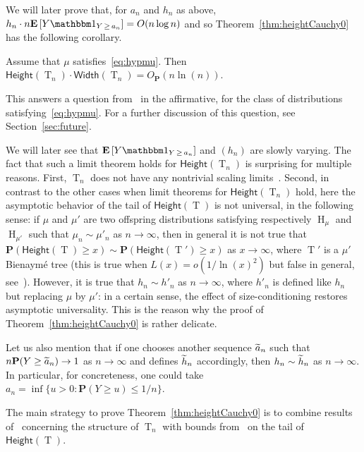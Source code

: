 \documentclass[AHL,Unicode,longabstracts,published]{cedram}
\renewcommand{\H}{\mathsf{Height}}
\newcommand{\p}{\mathbf{P}}
\newcommand{\Width}{\mathsf{Width}}
\newcommand{\E}[1]{{\mathbf E}\left[#1\right]}
\DeclareMathOperator{\rtree}{T}
\DeclareMathOperator{\rmH}{H}
\newcommand{\I}[1]{{\mathbbm 1}_{#1}}
\let\oldtilde\tilde
\renewcommand*{\tilde}[1]{\mathchoice{\widetilde{#1}}{\widetilde{#1}}{\oldtilde{#1}}{\oldtilde{#1}}}
\begin{document}
We will later prove that, for $a_n$ and $h_n$ as above, $h_{n}\cdot n \E{Y\I{Y\,\ge\,a_n}}=O(n \log n)$ and so Theorem~\ref{thm:heightCauchy0} has the following corollary.
\begin{coro}\label{cor:hw}
Assume that $\mu$ satisfies~\eqref{eq:hypmu}. Then $\H(\rtree_{n}) \cdot \Width(\rtree_{n}) = O_{\p}({n \ln(n)})$.
\end{coro}

This answers a question from~\cite{Add19} in the affirmative, for the class of distributions satisfying~\eqref{eq:hypmu}. For a further discussion of this question, see Section~\ref{sec:future}.

We will later see that $\E{Y\I{Y\,\ge\,a_n}}$ and $(h_{n})$ are slowly varying. The fact that such a limit theorem holds for $\H(\rtree_{n})$ is surprising for multiple reasons. First, $\rtree_{n}$ does not have any nontrivial scaling limits~\cite{KR19}. Second, in contrast to the other cases when limit theorems for $\H(\rtree_{n})$ hold, here the asymptotic behavior of the tail of $\H(\rtree)$ is not universal, in the following sense: if $\mu$ and $\mu'$ are two offspring distributions satisfying respectively $\rmH_\mu$ and $\rmH_{\mu'}$ such that $\mu_n \sim \mu'_n$ as $n \rightarrow \infty$, then in general it is not true that $\p(\H(\rtree) \geq x) \sim \p(\H(\rtree') \geq x)$ as $ x \rightarrow \infty$, where $\rtree'$ is a $\mu'$ Bienaymé tree (this is true when $L(x)=o(1/\ln(x)^{2})$ but false in general, see~\cite[Section~3.2]{NW07}). However, it is true that $h_{n} \sim h'_{n}$ as $n \rightarrow \infty$, where $h'_{n}$ is defined like $h_{n}$ but replacing $\mu$ by $\mu'$: in a certain sense, the effect of size-conditioning restores asymptotic universality. This is the reason why the proof of Theorem~\ref{thm:heightCauchy0} is rather delicate.


Let us also mention that if one chooses another sequence $\tilde{a}_n$ such that $n \p(Y \ge \tilde{a}_n) \to 1$ as $n \to \infty$ and defines $\tilde{h}_{n}$ accordingly, then $h_{n} \sim \tilde{h}_{n}$ as $n \rightarrow \infty$. In particular, for concreteness, one could take $a_{n}= \inf\{u >0: \p(Y \geq u) \leq 1/n\} $.

The main strategy to prove Theorem~\ref{thm:heightCauchy0} is to combine results of~\cite{KR19} concerning the structure of $\rtree_{n}$ with bounds from~\cite{NW07} on the tail of $\H(\rtree)$.
\end{document}
